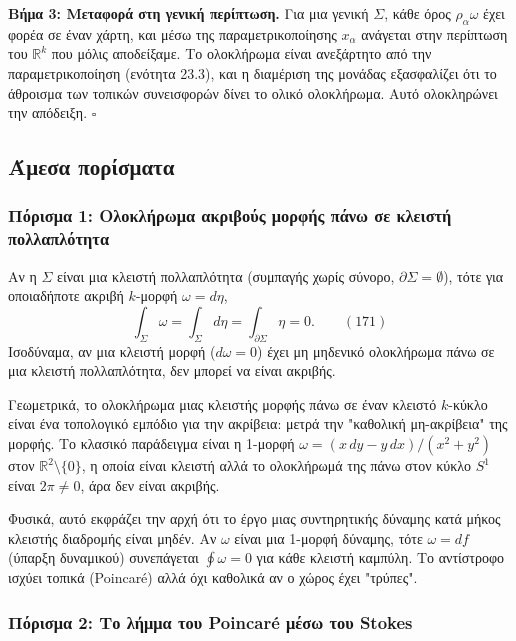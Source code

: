 \documentclass[12pt]{article}
\begin{document}
\textbf{Βήμα 3: Μεταφορά στη γενική περίπτωση.} Για μια γενική $\Sigma$, κάθε όρος $\rho_\alpha \omega$ έχει φορέα σε έναν χάρτη, και μέσω της παραμετρικοποίησης $x_\alpha$ ανάγεται στην περίπτωση του $\mathbb{R}^k$ που μόλις αποδείξαμε. Το ολοκλήρωμα είναι ανεξάρτητο από την παραμετρικοποίηση (ενότητα 23.3), και η διαμέριση της μονάδας εξασφαλίζει ότι το άθροισμα των τοπικών συνεισφορών δίνει το ολικό ολοκλήρωμα. Αυτό ολοκληρώνει την απόδειξη. $\square$

\subsection{Άμεσα πορίσματα}

\subsubsection{Πόρισμα 1: Ολοκλήρωμα ακριβούς μορφής πάνω σε κλειστή πολλαπλότητα}

Αν η $\Sigma$ είναι μια κλειστή πολλαπλότητα (συμπαγής χωρίς σύνορο, $\partial \Sigma = \emptyset$), τότε για οποιαδήποτε ακριβή $k$-μορφή $\omega = d\eta$,
\begin{equation}
\int_\Sigma \omega = \int_\Sigma d\eta = \int_{\partial \Sigma} \eta = 0. \qquad (171)
\end{equation}
Ισοδύναμα, αν μια κλειστή μορφή ($d\omega = 0$) έχει μη μηδενικό ολοκλήρωμα πάνω σε μια κλειστή πολλαπλότητα, δεν μπορεί να είναι ακριβής.

Γεωμετρικά, το ολοκλήρωμα μιας κλειστής μορφής πάνω σε έναν κλειστό $k$-κύκλο είναι ένα τοπολογικό εμπόδιο για την ακρίβεια: μετρά την "καθολική μη-ακρίβεια" της μορφής. Το κλασικό παράδειγμα είναι η 1-μορφή $\omega = (x \, dy - y \, dx)/(x^2 + y^2)$ στον $\mathbb{R}^2 \setminus \{0\}$, η οποία είναι κλειστή αλλά το ολοκλήρωμά της πάνω στον κύκλο $S^1$ είναι $2\pi \neq 0$, άρα δεν είναι ακριβής.

Φυσικά, αυτό εκφράζει την αρχή ότι το έργο μιας συντηρητικής δύναμης κατά μήκος κλειστής διαδρομής είναι μηδέν. Αν $\omega$ είναι μια 1-μορφή δύναμης, τότε $\omega = df$ (ύπαρξη δυναμικού) συνεπάγεται $\oint \omega = 0$ για κάθε κλειστή καμπύλη. Το αντίστροφο ισχύει τοπικά (Poincaré) αλλά όχι καθολικά αν ο χώρος έχει "τρύπες".

\subsubsection{Πόρισμα 2: Το λήμμα του Poincaré μέσω του Stokes}
\end{document}
